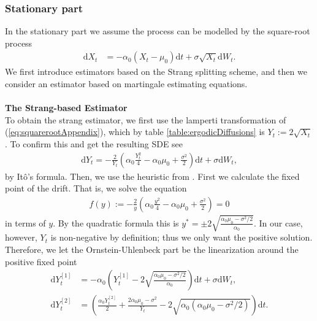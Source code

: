 \subsubsection{Stationary part}\label{subsubsec:squarerootStationary}
In the stationary part we assume the process can be modelled by the square-root process
\begin{align}
    \mathrm{d}X_t &= -\alpha_0\left(X_t - \mu_0\right)\mathrm{d}t + \sigma \sqrt{X_t} \mathrm{d}W_t. \label{eq:squarerootAppendix}
\end{align}
We first introduce estimators based on the Strang splitting scheme, and then we consider an estimator based on martingale estimating equations.\\\\
\noindent \textbf{The Strang-based Estimator}\\
To obtain the strang estimator, we first use the lamperti transformation of (\ref{eq:squarerootAppendix}), which by table \ref{table:ergodicDiffusions} is $Y_t := 2\sqrt{X_t}$. To confirm this and get the resulting SDE see
\begin{align}
    \mathrm{d}Y_t = - \frac{2}{Y_t}\left(\alpha_0 \frac{Y_t^2}{4} - \alpha_0 \mu_0 + \frac{\sigma^2}{2}\right)\mathrm{d}t + \sigma \mathrm{d}W_t, \label{eq:lampertiSquarerootAppendix}
\end{align}
by Itô's formula. Then, we use the heuristic from \cite[section 2.3 and 2.5]{SplittingSchemes}. First we calculate the fixed point of the drift. That is, we solve the equation
\begin{align}
    f(y) := - \frac{2}{y}\left(\alpha_0 \frac{y^2}{4} - \alpha_0 \mu_0 + \frac{\sigma^2}{2}\right) = 0
\end{align}
in terms of $y$. By the quadratic formula this is $y^* = \pm 2\sqrt{\frac{\alpha_0\mu_0 - \sigma^2 / 2}{\alpha_0}}$. In our case, however, $Y_t$ is non-negative by definition; thus we only want the positive solution. Therefore, we let the Ornstein-Uhlenbeck part be the linearization around the positive fixed point
\begin{align}
    \mathrm{d}Y_t^{[1]} &= -\alpha_0 \left(Y_t^{[1]} - 2\sqrt{\frac{\alpha_0\mu_0 - \sigma^2 / 2}{\alpha_0}}\right)\mathrm{d}t + \sigma \mathrm{d}W_t , \label{eq:squarerootStationarySplit1} \\
    \mathrm{d}Y_t^{[2]} &= \left(\frac{\alpha_0 Y_t^{[2]}}{2} + \frac{2\alpha_0 \mu_0 - \sigma^2}{Y_t} - 2\sqrt{\alpha_0\left(\alpha_0\mu_0 - \sigma^2 / 2\right)}\right)\mathrm{d}t. \label{eq:squarerootStationarySplit2}
\end{align}
